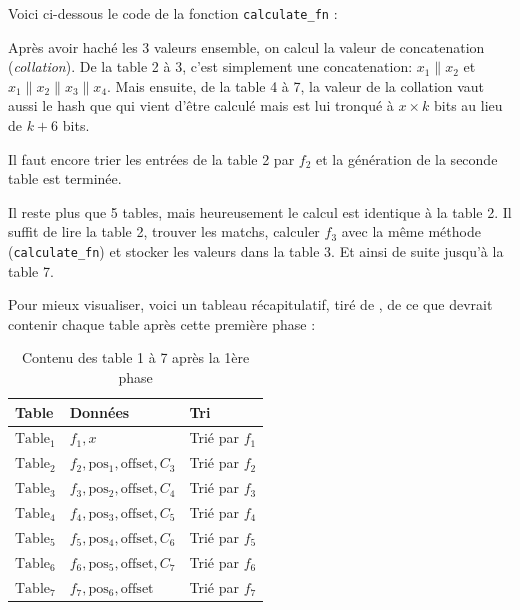 Voici ci-dessous le code de la fonction \verb|calculate_fn| :


Après avoir haché les 3 valeurs ensemble, on calcul la valeur de concatenation (\emph{collation}). De la table 2 à 3, c'est simplement une concatenation: $x_1\|x_2$ et $x_1\|x_2\|x_3\|x_4$. Mais ensuite, de la table 4 à 7, la valeur de la collation vaut aussi le hash que qui vient d'être calculé mais est lui tronqué à $x \times k$ bits au lieu de $k + 6$ bits.

Il faut encore trier les entrées de la table 2 par $f_2$ et la génération de la seconde table est terminée.

Il reste plus que 5 tables, mais heureusement le calcul est identique à la table 2. Il suffit de lire la table 2, trouver les matchs, calculer $f_3$ avec la même méthode (\verb|calculate_fn|) et stocker les valeurs dans la table 3. Et ainsi de suite jusqu'à la table 7.

Pour mieux visualiser, voici un tableau récapitulatif, tiré de \cite{chia:construction}, de ce que devrait contenir chaque table après cette première phase :

\begin{table}[H]
  \centering
  \begin{tabular}{l l l}
    \textbf{Table} & \textbf{Données} & \textbf{Tri} \\
    \hline
    \hline
    $\mathrm{Table_1}$ & $f_1,x$ & Trié par $f_1$ \\
    \hline
    $\mathrm{Table_2}$ & $f_2,\mathrm{pos_1},\mathrm{offset},C_3$ & Trié par $f_2$ \\
    \hline
    $\mathrm{Table_3}$ & $f_3,\mathrm{pos_2},\mathrm{offset},C_4$ & Trié par $f_3$ \\
    \hline
    $\mathrm{Table_4}$ & $f_4,\mathrm{pos_3},\mathrm{offset},C_5$ & Trié par $f_4$ \\
    \hline
    $\mathrm{Table_5}$ & $f_5,\mathrm{pos_4},\mathrm{offset},C_6$ & Trié par $f_5$ \\
    \hline
    $\mathrm{Table_6}$ & $f_6,\mathrm{pos_5},\mathrm{offset},C_7$ & Trié par $f_6$ \\
    \hline
    $\mathrm{Table_7}$ & $f_7,\mathrm{pos_6},\mathrm{offset}$ & Trié par $f_7$ \\
    \hline
  \end{tabular}
  \caption{Contenu des table 1 à 7 après la 1ère phase}
\end{table}

